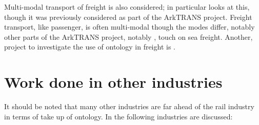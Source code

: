 Multi-modal transport of freight is also considered; \cite{Gonczy2012} in particular looks at this, though it was previously considered as part of the ArkTRANS project. Freight transport, like passenger, is often multi-modal though the modes differ, notably other parts of the ArkTRANS project, notably \cite{Rødseth2011}, touch on sea freight. Another, project to investigate the use of ontology in freight is \cite{Paganelli2009}.

\section{Work done in other industries}
It should be noted that many other industries are far ahead of the rail industry in terms of take up of ontology. In \cite{Morris2014} the following industries are discussed:


